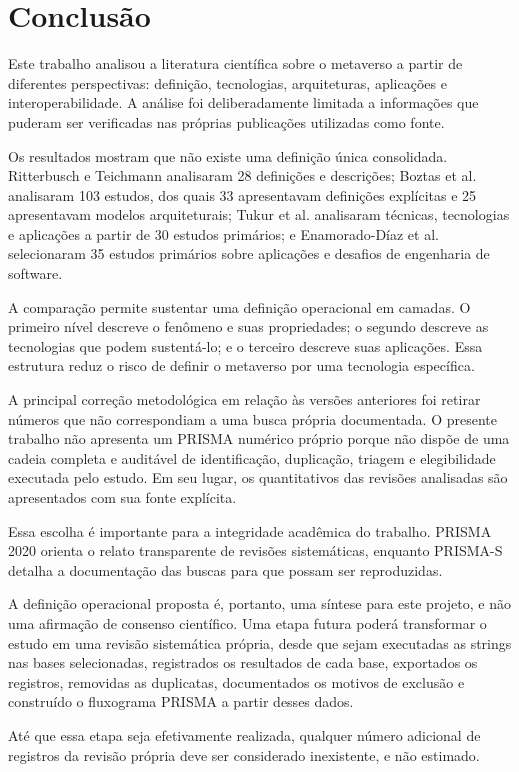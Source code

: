 \chapter{Conclusão}
\label{cha:conclusao}

Este trabalho analisou a literatura científica sobre o metaverso a partir de diferentes perspectivas: definição, tecnologias, arquiteturas, aplicações e interoperabilidade. A análise foi deliberadamente limitada a informações que puderam ser verificadas nas próprias publicações utilizadas como fonte.

Os resultados mostram que não existe uma definição única consolidada. Ritterbusch e Teichmann analisaram 28 definições e descrições; Boztas et al. analisaram 103 estudos, dos quais 33 apresentavam definições explícitas e 25 apresentavam modelos arquiteturais; Tukur et al. analisaram técnicas, tecnologias e aplicações a partir de 30 estudos primários; e Enamorado-Díaz et al. selecionaram 35 estudos primários sobre aplicações e desafios de engenharia de software. \cite{ritterbusch2023,boztas2025,tukur2024,enamorado2025}

A comparação permite sustentar uma definição operacional em camadas. O primeiro nível descreve o fenômeno e suas propriedades; o segundo descreve as tecnologias que podem sustentá-lo; e o terceiro descreve suas aplicações. Essa estrutura reduz o risco de definir o metaverso por uma tecnologia específica.

A principal correção metodológica em relação às versões anteriores foi retirar números que não correspondiam a uma busca própria documentada. O presente trabalho não apresenta um PRISMA numérico próprio porque não dispõe de uma cadeia completa e auditável de identificação, duplicação, triagem e elegibilidade executada pelo estudo. Em seu lugar, os quantitativos das revisões analisadas são apresentados com sua fonte explícita.

Essa escolha é importante para a integridade acadêmica do trabalho. PRISMA 2020 orienta o relato transparente de revisões sistemáticas, enquanto PRISMA-S detalha a documentação das buscas para que possam ser reproduzidas. \cite{page2021,rethlefsen2021}

A definição operacional proposta é, portanto, uma síntese para este projeto, e não uma afirmação de consenso científico. Uma etapa futura poderá transformar o estudo em uma revisão sistemática própria, desde que sejam executadas as strings nas bases selecionadas, registrados os resultados de cada base, exportados os registros, removidas as duplicatas, documentados os motivos de exclusão e construído o fluxograma PRISMA a partir desses dados.

Até que essa etapa seja efetivamente realizada, qualquer número adicional de registros da revisão própria deve ser considerado inexistente, e não estimado.
